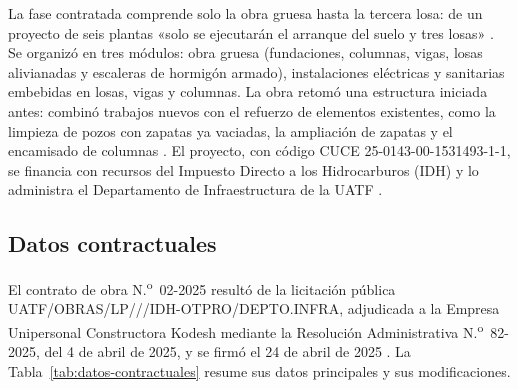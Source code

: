 La fase contratada comprende solo la obra gruesa hasta la tercera losa: de un proyecto de seis plantas «solo se ejecutarán el arranque del suelo y tres losas» \parencite[p.~8]{uatf2025pao2}. Se organizó en tres módulos: obra gruesa (fundaciones, columnas, vigas, losas alivianadas y escaleras de hormigón armado), instalaciones eléctricas y sanitarias embebidas en losas, vigas y columnas. La obra retomó una estructura iniciada antes: combinó trabajos nuevos con el refuerzo de elementos existentes, como la limpieza de pozos con zapatas ya vaciadas, la ampliación de zapatas y el encamisado de columnas \parencite[p.~8]{uatf2025pao2}. El proyecto, con código CUCE 25-0143-00-1531493-1-1, se financia con recursos del Impuesto Directo a los Hidrocarburos (IDH) y lo administra el Departamento de Infraestructura de la UATF \parencite[pp.~3, 7]{uatf2025pao2}.

\subsection{Datos contractuales}
\label{sec:datos-contractuales}

El contrato de obra N.\textsuperscript{o}~02-2025 resultó de la licitación pública UATF/\allowbreak OBRAS/\allowbreak LP///\allowbreak IDH-OTPRO/\allowbreak DEPTO.INFRA, adjudicada a la Empresa Unipersonal Constructora Kodesh mediante la Resolución Administrativa N.\textsuperscript{o}~82-2025, del 4 de abril de 2025, y se firmó el 24 de abril de 2025 \parencite[pp.~91, 112]{uatf2025pao2}. La Tabla~\ref{tab:datos-contractuales} resume sus datos principales y sus modificaciones.

